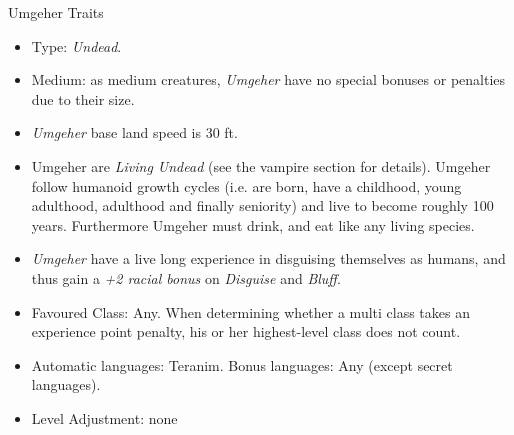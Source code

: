 \begin{35e}{Umgeher Traits}
  \begin{itemize}[noitemsep]
    \item Type: \emph{Undead}.
    \item Medium: as medium creatures, \emph{Umgeher} have no special bonuses or
      penalties due to their size.
    \item \emph{Umgeher} base land speed is 30 ft.
    \item Umgeher are \emph{Living Undead} (see the vampire section for
      details). Umgeher follow humanoid growth cycles (i.e. are born, have a
      childhood, young adulthood, adulthood and finally seniority) and live to
      become roughly 100 years. Furthermore Umgeher must drink, and eat like
      any living species.
    \item \emph{Umgeher} have a live long experience in disguising themselves as
      humans, and thus gain a \emph{+2 racial bonus} on \emph{Disguise} and
      \emph{Bluff}.
    \item Favoured Class: Any. When determining whether a multi class takes an
      experience point penalty, his or her highest-level class does not count.
    \item Automatic languages: Teranim. Bonus languages: Any (except secret
      languages).
    \item Level Adjustment: none
  \end{itemize}
\end{35e}
